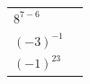 {\begin{tabular}[t]{|l|l|}
                  ${8}^{7-6}$
                 &
     \tabularnewline\cline{1-1}\cline{2-2}
                  ${\left(-3\right)}^{-1}$
                 &
     \tabularnewline\cline{1-1}\cline{2-2}
                  ${\left(-1\right)}^{23}$
                 &
     \tabularnewline\cline{1-1}\cline{2-2}
    \end{tabular}} %
